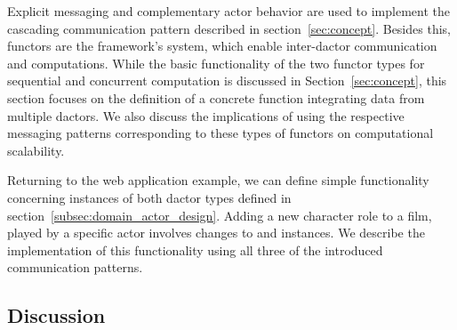 Explicit messaging and complementary actor behavior are used to implement the cascading communication pattern described in section~\ref{sec:concept}.
Besides this, \glspl{functor} are the framework's system, which enable inter-\gls{dactor} communication and computations.
While the basic functionality of the two \gls{functor} types for sequential and concurrent computation is discussed in Section~\ref{sec:concept}, this section focuses on the definition of a concrete function integrating data from multiple \glspl{dactor}.
We also discuss the implications of using the respective messaging patterns corresponding to these types of \glspl{functor} on computational scalability.

Returning to the web application example, we can define simple functionality concerning instances of both \gls{dactor} types defined in section~\ref{subsec:domain_actor_design}.
Adding a new character role to a film, played by a specific actor involves changes to  and  instances.
We describe the implementation of this functionality using all three of the introduced communication patterns.


\subsection{Discussion}\label{subsec:discussion}
